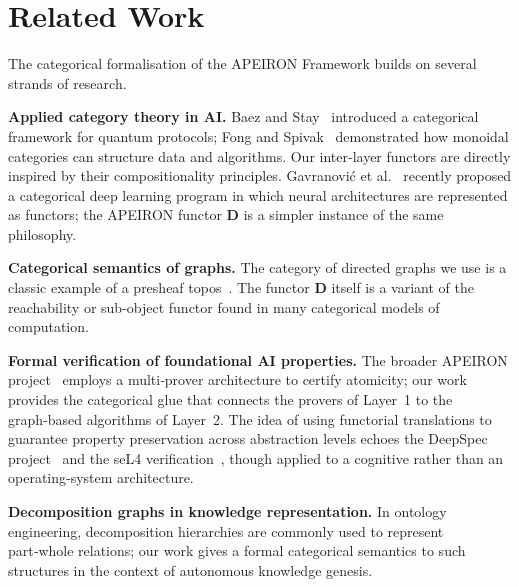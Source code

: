 \section{Related Work}
The categorical formalisation of the APEIRON Framework builds on several strands of research.

\noindent\textbf{Applied category theory in AI.}
Baez and Stay~\cite{Baez2011} introduced a categorical framework for quantum protocols; Fong and Spivak~\cite{Fong2019} demonstrated how monoidal categories can structure data and algorithms.
Our inter‑layer functors are directly inspired by their compositionality principles.
Gavranovi{\'c} et al.~\cite{Gavranovic2024} recently proposed a categorical deep learning program in which neural architectures are represented as functors; the APEIRON functor \(\mathbf{D}\) is a simpler instance of the same philosophy.

\textbf{Categorical semantics of graphs.}
The category of directed graphs we use is a classic example of a presheaf topos~\cite{MacLane}.
The functor \(\mathbf{D}\) itself is a variant of the reachability or sub‑object functor found in many categorical models of computation.

\textbf{Formal verification of foundational AI properties.}
The broader APEIRON project~\cite{Beniers2026Apeiron} employs a multi‑prover architecture to certify atomicity; our work provides the categorical glue that connects the provers of Layer~1 to the graph‑based algorithms of Layer~2.
The idea of using functorial translations to guarantee property preservation across abstraction levels echoes the DeepSpec project~\cite{Deepspec2016} and the seL4 verification~\cite{Klein2009}, though applied to a cognitive rather than an operating‑system architecture.

\textbf{Decomposition graphs in knowledge representation.}
In ontology engineering, decomposition hierarchies are commonly used to represent part‑whole relations; our work gives a formal categorical semantics to such structures in the context of autonomous knowledge genesis.